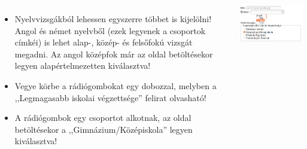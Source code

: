 \begin{frame}
  \begin{columns}[c]
      \begin{itemize}
        \small
        \item Nyelvvizsgákból lehessen egyszerre többet is kijelölni! Angol és német nyelvből (ezek legyenek a csoportok címkéi) is lehet alap-, közép- és felsőfokú vizsgát megadni. Az angol középfok már az oldal betöltésekor legyen alapértelmezetten kiválasztva!
        \item Vegye körbe a rádiógombokat egy dobozzal, melyben a ,,Legmagasabb iskolai végzettsége'' felirat olvasható!
        \item A rádiógombok egy csoportot alkotnak, az oldal betöltésekor a ,,Gimnázium/Középiskola'' legyen kiválasztva!
      \end{itemize}
      \begin{exampleblock}{}
        \includegraphics[width=\textwidth]{urlap-1.png}
      \end{exampleblock}
  \end{columns}
\end{frame}


